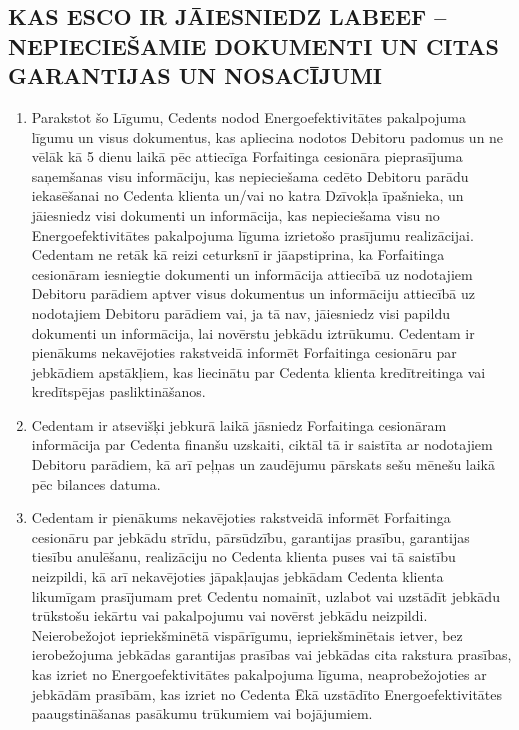 \documentclass[a4paper]{article}
\begin{document}
\begin{multicols}{2}

  \subsection{KAS ESCO IR JĀIESNIEDZ LABEEF – NEPIECIEŠAMIE
DOKUMENTI UN CITAS GARANTIJAS UN NOSACĪJUMI}

  \begin{enumerate}
  \item{Parakstot šo Līgumu, Cedents nodod Energoefektivitātes pakalpojuma
līgumu un visus dokumentus, kas apliecina nodotos Debitoru padomus
un ne vēlāk kā 5 dienu laikā pēc attiecīga Forfaitinga cesionāra
pieprasījuma saņemšanas visu informāciju, kas nepieciešama cedēto
Debitoru parādu iekasēšanai no Cedenta klienta un/vai no katra
Dzīvokļa īpašnieka, un jāiesniedz visi dokumenti un informācija, kas
nepieciešama visu no Energoefektivitātes pakalpojuma līguma izrietošo
prasījumu realizācijai. Cedentam ne retāk kā reizi ceturksnī ir
jāapstiprina, ka Forfaitinga cesionāram iesniegtie dokumenti un
informācija attiecībā uz nodotajiem Debitoru parādiem aptver visus
dokumentus un informāciju attiecībā uz nodotajiem Debitoru parādiem
vai, ja tā nav, jāiesniedz visi papildu dokumenti un informācija, lai
novērstu jebkādu iztrūkumu. Cedentam ir pienākums nekavējoties
rakstveidā informēt Forfaitinga cesionāru par jebkādiem apstākļiem,
kas liecinātu par Cedenta klienta kredītreitinga vai kredītspējas
pasliktināšanos.}

  \item{Cedentam ir atsevišķi jebkurā laikā jāsniedz Forfaitinga cesionāram
informācija par Cedenta finanšu uzskaiti, ciktāl tā ir saistīta ar
nodotajiem Debitoru parādiem, kā arī peļņas un zaudējumu pārskats
sešu mēnešu laikā pēc bilances datuma.}

  \item{Cedentam ir pienākums nekavējoties rakstveidā informēt Forfaitinga
cesionāru par jebkādu strīdu, pārsūdzību, garantijas prasību, garantijas
tiesību anulēšanu, realizāciju no Cedenta klienta puses vai tā saistību
neizpildi, kā arī nekavējoties jāpakļaujas jebkādam Cedenta klienta
likumīgam prasījumam pret Cedentu nomainīt, uzlabot vai uzstādīt
jebkādu trūkstošu iekārtu vai pakalpojumu vai novērst jebkādu
neizpildi. Neierobežojot iepriekšminētā vispārīgumu, iepriekšminētais
ietver, bez ierobežojuma jebkādas garantijas prasības vai jebkādas cita
rakstura prasības, kas izriet no Energoefektivitātes pakalpojuma
līguma, neaprobežojoties ar jebkādām prasībām, kas izriet no Cedenta
Ēkā uzstādīto Energoefektivitātes paaugstināšanas pasākumu
trūkumiem vai bojājumiem.}


\end{enumerate}
\end{multicols}
\end{document}
